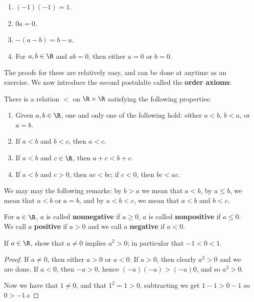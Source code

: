 \begin{enumerate}[label=(\arabic*)]
   \item $(-1)(-1)=1$.

   \item $0a=0$.

   \item $-(a-b)=b-a$.

   \item For $a,b \in \R$ and $ab=0$, then either $a=0$ or $b=0$.
\end{enumerate}

The proofs for these are relatively easy, and can be done at anytime as an exercise. We now introduce the second postulalte 
called the \textbf{order axioms}:

\begin{postulate}
  There is a relation $<$ on $\R \times \R$ satisfying the following properties:
    \begin{enumerate}[label=(\arabic*)]
      \item Given $a,b \in \R$, one and only one of the following hold: either $a<b$, $b<a$, or $a=b$.

      \item If $a<b$ and $b<c$, then $a<c$.

      \item If $a<b$ and $c \in \R$, then $a+c<b+c$.

      \item If $a<b$ and $c>0$, then $ac<bc$; if $c<0$, then $bc<ac$.
    \end{enumerate}
\end{postulate}

We may may the following remarks: by $b>a$ we mean that $a<b$, by $a \leq b$, we mean that $a<b$ or $a=b$, and by $a<b<c$, 
we mean that $a<b$ and $b<c$.

\begin{definition}
  For $a \in \R$, $a$ is called \textbf{nonnegative} if $a \geq 0$, $a$ is called \textbf{nonpositive} if $a \leq 0$. 
  We call $a$ \textbf{positive} if $a>0$ and we call $a$ \textbf{negative} if $a<0$.
\end{definition}

\begin{example}
  If $a \in \R$, show that $a \neq 0$ implies $a^2>0$; in particular that $-1<0<1$.
\end{example}
\begin{proof}
  If $a \neq 0$, then either $a>0$ or $a<0$. If $a>0$, then clearly $a^2>0$ and we are done. If $a<0$, then $-a>0$, 
  hence $(-a)(-a)>(-a)0$, and so $a^2>0$.

  Now we have that $1 \neq 0$, and that $1^2=1>0$, subtracting we get $1-1>0-1$ so $0>-1$.s
\end{proof}

